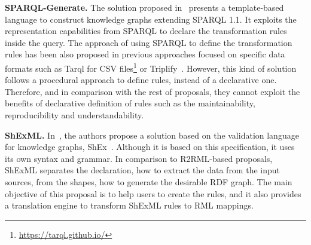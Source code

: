 \noindent\textbf{SPARQL-Generate.} The solution proposed in~\citep{lefranccois2017sparql} presents a template-based language to construct knowledge graphs extending SPARQL 1.1. It exploits the representation capabilities from SPARQL to declare the transformation rules inside the query. The approach of using SPARQL to define the transformation rules has been also proposed in previous approaches focused on specific data formats such as Tarql for CSV files\footnote{\url{https://tarql.github.io/}} or Triplify~\citep{auer2009triplify}. However, this kind of solution follows a procedural approach to define rules, instead of a declarative one. Therefore, and in comparison with the rest of proposals, they cannot exploit the benefits of declarative definition of rules such as the maintainability, reproducibility and understandability.

\noindent\textbf{ShExML.} In~\citep{garcia2020shexml}, the authors propose a solution based on the validation language for knowledge graphs, ShEx~\citep{prud2014shape}. Although it is based on this specification, it uses its own syntax and grammar. In comparison to R2RML-based proposals, ShExML separates the declaration, how to extract the data from the input sources, from the shapes, how to generate the desirable RDF graph. The main objective of this proposal is to help users to create the rules, and it also provides a translation engine to transform ShExML rules to RML mappings.


